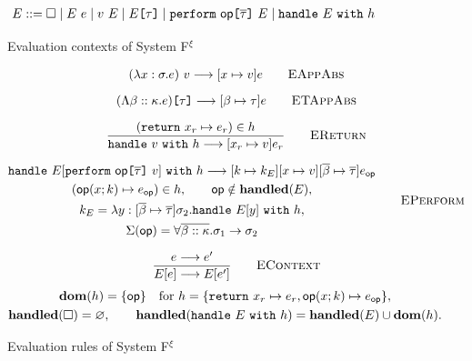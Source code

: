 \begin{figure}[p]
    \small
    \begin{align*}
        E &::= \square
             \mid E~e
             \mid v~E
             \mid E\texttt{[} \tau \texttt{]}
             \mid \texttt{perform}~\mathsf{op}
                  \texttt{[} \overline{\tau} \texttt{]}~E
             \mid \texttt{handle}~E~\texttt{with}~h
    \end{align*}
    \caption{Evaluation contexts of System F$^{\xi}$}
    \label{systemf:evaluation-contexts}
\end{figure}

\begin{figure}[p]
    \small
    \noindent{}

    \medskip
    \begin{gather*}
        (\lambda x:\sigma.e)~v
        \longrightarrow [x\mapsto v]e
        \qquad\textsc{EAppAbs}
        \\[6pt]
        (\Lambda\beta::\kappa.e)\texttt{[} \tau \texttt{]}
        \longrightarrow [\beta\mapsto\tau]e
        \qquad\textsc{ETAppAbs}
        \\[6pt]
        \frac{(\texttt{return}~x_r\mapsto e_r)\in h}
             {\texttt{handle}~v~\texttt{with}~h
              \longrightarrow [x_r\mapsto v]e_r}
        \qquad\textsc{EReturn}
        \\[6pt]
        \begin{gathered}
        \texttt{handle}~
          E[\texttt{perform}~\mathsf{op}
             \texttt{[} \overline{\tau} \texttt{]}~v]~
          \texttt{with}~h
        \longrightarrow
          [k\mapsto k_E][x\mapsto v]
          [\overline{\beta}\mapsto\overline{\tau}]
          e_{\mathsf{op}}\\
        (\mathsf{op}(x;k)\mapsto e_{\mathsf{op}})\in h,
        \qquad\mathsf{op}\notin\mathbf{handled}(E),\\
        k_E=\lambda y:
          [\overline{\beta}\mapsto\overline{\tau}]\sigma_2.
          \texttt{handle}~E[y]~\texttt{with}~h,\\
        \Sigma(\mathsf{op})=
          \forall\overline{\beta::\kappa}.\sigma_1\to\sigma_2
        \end{gathered}
        \qquad\textsc{EPerform}
        \\[6pt]
        \frac{e\longrightarrow e'}{E[e]\longrightarrow E[e']}
        \qquad\textsc{EContext}
    \end{gather*}
    \[\begin{gathered}
        \mathbf{dom}(h)=\{\mathsf{op}\}\quad
        \text{for }h=\{\texttt{return}~x_r\mapsto e_r,
          \mathsf{op}(x;k)\mapsto e_{\mathsf{op}}\},
        \\
        \mathbf{handled}(\square)=\varnothing,\qquad
        \mathbf{handled}(\texttt{handle}~E~\texttt{with}~h)
          =\mathbf{handled}(E)\cup\mathbf{dom}(h).
    \end{gathered}\]

    \caption{Evaluation rules of System F$^{\xi}$}
    \label{systemf:evaluation-rules}
\end{figure}
